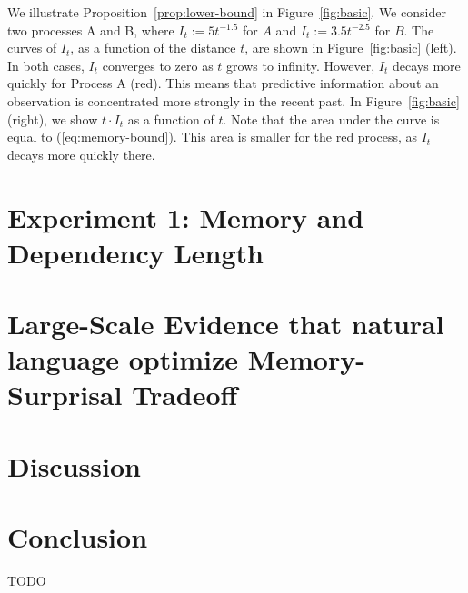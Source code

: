 \documentclass[11pt,letterpaper]{article}
\begin{document}
We illustrate Proposition~\ref{prop:lower-bound} in Figure~\ref{fig:basic}.
We consider two processes A and B, where $I_t := 5t^{-1.5}$ for $A$ and $I_t := 3.5 t^{-2.5}$ for $B$.
The curves of $I_t$, as a function of the distance $t$, are shown in Figure~\ref{fig:basic} (left).
In both cases, $I_t$ converges to zero as $t$ grows to infinity. 
However, $I_t$ decays more quickly for Process A (red).
This means that predictive information about an observation is concentrated more strongly in the recent past.
In Figure~\ref{fig:basic} (right), we show $t\cdot I_t$ as a function of $t$.
Note that the area under the curve is equal to (\ref{eq:memory-bound}).
This area is smaller for the red process, as $I_t$ decays more quickly there.  


\section{Experiment 1: Memory and Dependency Length}





\section{Large-Scale Evidence that natural language optimize Memory-Surprisal Tradeoff}



\section{Discussion}




\section{Conclusion}

TODO





\appendix
\end{document}
